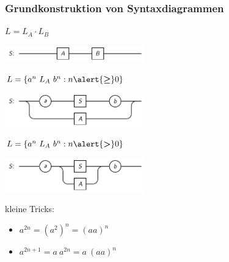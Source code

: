 \documentclass{beamer}
\begin{document}
\begin{frame} \frametitle{Grundkonstruktion von Syntaxdiagrammen}
	$L = L_A \cdot L_B$
	\vspace{-.5\baselineskip} \pause
	\begin{center}
		\includegraphics[width=6cm]{tut02_syntax-dia-basic-conc.pdf}
	\end{center}
	\pause

	$L = \menge{a^n \ L_A \ b^n : n \alert{\bm\ge} 0}$
	\vspace{-.5\baselineskip} \pause
	\begin{center}
		\includegraphics[width=6cm]{tut02_syntax-dia-basic0.pdf}
	\end{center}
	\pause

	$L = \menge{a^n \ L_A \ b^n : n \alert{\bm >} 0}$
	\vspace{-.5\baselineskip} \pause
	\begin{center}
		\includegraphics[width=6cm]{tut02_syntax-dia-basic1.pdf}
	\end{center}
	
	\vspace{-\baselineskip} \pause
	kleine Tricks:
	\begin{itemize}
		\item $a^{2n} = (a^2)^n = (aa)^n$
		\item $a^{2n+1} = a \ a^{2n} = a \ (aa)^n$
	\end{itemize}
\end{frame}
\end{document}
